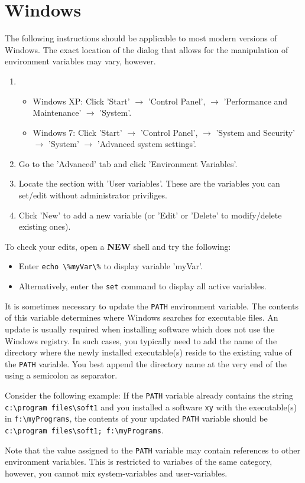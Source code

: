 \section{Windows} \label{sec:appendix:envVars:windows}

The following instructions should be applicable to most modern versions of Windows. The exact location of the dialog that allows for the manipulation of environment variables may vary, however.

\begin{enumerate}
  \item
  \begin{itemize}
    \item Windows XP: Click 'Start' $\rightarrow$ 'Control Panel', $\rightarrow$ 'Performance and Maintenance' $\rightarrow$ 'System'.
    \item Windows 7: Click 'Start' $\rightarrow$ 'Control Panel', $\rightarrow$ 'System and Security' $\rightarrow$ 'System' $\rightarrow$ 'Advanced system settings'.
  \end{itemize}
  \item Go to the 'Advanced' tab and click 'Environment Variables'.
  \item Locate the section with 'User variables'. These are the variables you can set/edit without administrator priviliges.
  \item Click 'New' to add a new variable (or 'Edit' or 'Delete' to modify/delete existing ones).
\end{enumerate}

To check your edits, open a \textbf{NEW} shell and try the following:
\begin{itemize}
  \item Enter \lstinline!echo \%myVar\%! to display variable 'myVar'.
  \item Alternatively, enter the \lstinline!set! command to display all active variables.
\end{itemize}

It is sometimes necessary to update the \verb!PATH! environment variable. The contents of this variable determines where Windows searches for executable files. An update is usually required when installing software which does not use the Windows registry. In such cases, you typically need to add the name of the directory where the newly installed executable(s) reside to the existing value of the \verb!PATH! variable. You best append the directory name at the very end of the using a semicolon as separator. 

Consider the following example: If the \verb!PATH! variable already contains the string \verb!c:\program files\soft1! and you installed a software \verb!xy! with the executable(s) in \verb!f:\myPrograms!, the contents of your updated \verb!PATH! variable should be \verb!c:\program files\soft1; f:\myPrograms!.

Note that the value assigned to the \verb!PATH! variable may contain references to other environment variables. This is restricted to variabes of the same category, however, \ie{} you cannot mix system-variables and user-variables.
